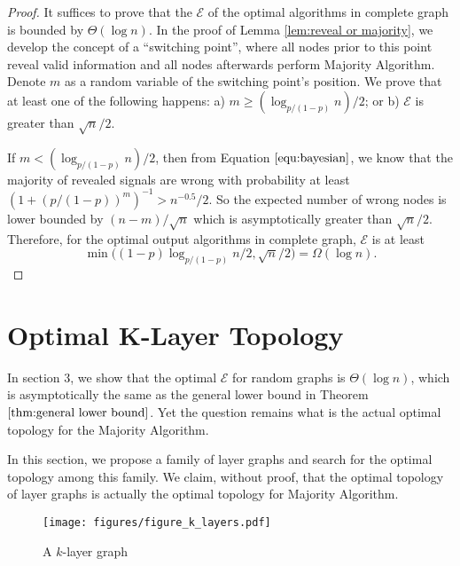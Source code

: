 \documentclass[a4paper,UKenglish]{lipics}
\theoremstyle{definition}
\begin{document}
\begin{proof}
It suffices to prove that 
	the $\mathcal{E}$ of the optimal algorithms in complete graph is bounded by $\Theta(\log n)$.
In the proof of Lemma \ref{lem:reveal or majority}, we develop the concept of a ``switching point'', 
	where all nodes prior to this point reveal valid information and all nodes afterwards perform Majority Algorithm.
Denote $m$ as a random variable of the switching point's position.
We prove that at least one of the following happens:
a) $m\geq (\log_{p/(1-p)}n) / 2$;  or
b) $\mathcal{E}$ is greater than $\sqrt{n}/2$.

If $m < (\log_{p/(1-p)}n) / 2$, then from Equation $\eqref{equ:bayesian}$, we know that the majority of revealed signals are wrong
	with probability at least 
	$
	({1 + (p/(1-p))^m})^{-1}
	> 
	{n^{-0.5}}/{2}.
	$
So the expected number of wrong nodes is lower bounded by $ {(n-m)} / {\sqrt{n}}$ which is asymptotically greater than ${\sqrt{n}}/2$. 
Therefore, for the optimal output algorithms in complete graph, $\mathcal{E}$ is at least
\begin{equation*}
	\min \Big((1 - p) \log_{p/(1-p)}n \Big/ 2,  \sqrt{n} \Big/2 \Big) 
	= 
	\Omega(\log n).
\end{equation*}
\end{proof}









\section {Optimal K-Layer Topology}

In section 3, we show that the optimal $\mathcal{E}$ for random graphs is $\Theta(\log n)$, which is asymptotically the same as the general lower bound in Theorem $\ref{thm:general lower bound}$.
Yet the question remains what is the actual optimal topology for the Majority Algorithm.

In this section, we propose a family of layer graphs and search for the optimal topology among this family.
We claim, without proof, that the optimal topology of layer graphs is actually the optimal topology for Majority Algorithm.

\begin{figure}
\centering
\texttt{[image: figures/figure\_k\_layers.pdf]}
\caption{A $k$-layer graph}
\label{fig:K-Layer}
\end{figure}
\end{document}
